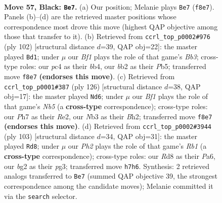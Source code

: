 \documentclass[11pt]{article}
\begin{document}
\clearpage

\begin{figure}[p]\centering
\begin{subfigure}{0.46\textwidth}\centering
\resizebox{\linewidth}{!}{%
\newchessgame
\chessboard[
  setfen={3r1b2/7p/p2p2k1/P3p2p/2P1P2R/1n3P2/1B2K1B1/8 b - - 1 57},
  showmover=false,
  pgfstyle=straightmove, color=movearrow, markmove={f8-e7}
]}
\caption{}
\end{subfigure}\hfill
\begin{subfigure}{0.46\textwidth}\centering
\resizebox{\linewidth}{!}{%
\newchessgame
\chessboard[
  setfen={8/2p5/1p6/pP3pkP/Pb1Pr3/1B1R4/5PK1/8 w - - 1 52},
  showmover=false,
  pgfstyle=straightmove, color=movearrow, markmove={b3-d1}
]}
\caption{}
\end{subfigure}
\\[4pt]
\begin{subfigure}{0.46\textwidth}\centering
\resizebox{\linewidth}{!}{%
\newchessgame
\chessboard[
  setfen={r7/3n1p2/4p3/1Np1P1bk/P1P4p/1K6/4R1PB/8 w - - 3 64},
  showmover=false,
  pgfstyle=straightmove, color=movearrow, markmove={b5-d6}
]}
\caption{}
\end{subfigure}\hfill
\begin{subfigure}{0.46\textwidth}\centering
\resizebox{\linewidth}{!}{%
\newchessgame
\chessboard[
  setfen={1r4k1/6p1/p4p1p/1pR4P/3P4/P5P1/3BbPK1/8 b - - 1 52},
  showmover=false,
  pgfstyle=straightmove, color=movearrow, markmove={b8-d8}
]}
\caption{}
\end{subfigure}
\caption{\textbf{Move 57, Black: \texttt{Be7}.} (a) Our position; Melanie plays \texttt{Be7} (\texttt{f8e7}). Panels (b)--(d) are the retrieved master positions whose correspondence most drove this move (highest QAP objective among those that transfer to it). (b) Retrieved from \texttt{ccrl\_top\_p0002\#976} (ply 102) [structural distance $d$=39, QAP obj=22]: the master played \texttt{Bd1}; under $\mu$ our \emph{Bf1} plays the role of that game's \emph{Bb3}; cross-type roles: our \emph{p}c4 as their \emph{b}b4, our \emph{b}b2 as their \emph{P}b5; transferred move \texttt{f8e7} \textbf{(endorses this move)}. (c) Retrieved from \texttt{ccrl\_top\_p0001\#387} (ply 126) [structural distance $d$=38, QAP obj=17]: the master played \texttt{Nd6}; under $\mu$ our \emph{Bf1} plays the role of that game's \emph{Nb5} (a \textbf{cross-type} correspondence); cross-type roles: our \emph{P}h7 as their \emph{R}e2, our \emph{N}b3 as their \emph{B}h2; transferred move \texttt{f8e7} \textbf{(endorses this move)}. (d) Retrieved from \texttt{ccrl\_top\_p0002\#3944} (ply 103) [structural distance $d$=34, QAP obj=31]: the master played \texttt{Rd8}; under $\mu$ our \emph{Ph2} plays the role of that game's \emph{Rb1} (a \textbf{cross-type} correspondence); cross-type roles: our \emph{R}d8 as their \emph{P}a6, our \emph{b}g2 as their \emph{p}g3; transferred move \texttt{h7h6}. Synthesis: 2 retrieved analogs transferred to \texttt{Be7} (summed QAP objective 39, the strongest correspondence among the candidate moves); Melanie committed it via the \texttt{search} selector.}
\label{fig:thought-m113}
\end{figure}
\end{document}
